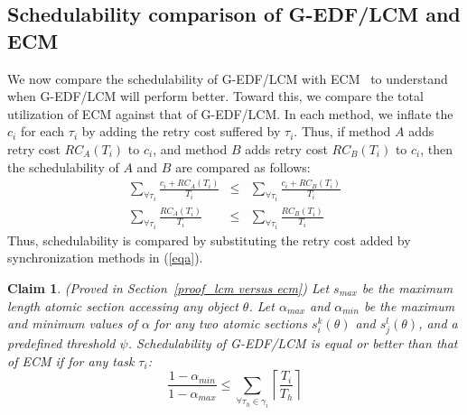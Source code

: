 \documentclass[conference]{sig-alternate}
\newtheorem{clm}{Claim}
\begin{document}
\subsection{Schedulability comparison of G-EDF/LCM and ECM}
\label{performance g-edf-lcm}
We now compare the schedulability of G-EDF/LCM with ECM~\cite{stmconcurrencycontrol:emsoft11} %
to understand when G-EDF/LCM will perform better. 
Toward this, we compare the total utilization of ECM against that of G-EDF/LCM. In each method, we inflate the $c_i$ for each $\tau_i$ by adding the retry cost suffered by $\tau_i$. Thus, if method $A$ adds retry cost $RC_A(T_i)$ to $c_i$, and method $B$ adds retry cost $RC_B(T_i)$ to $c_i$, then the schedulability of $A$ and $B$ are compared as follows:
\begin{eqnarray}
\sum_{\forall \tau_{i}}\frac{c_{i}+RC_A(T_{i})}{T_{i}} & \le & \sum_{\forall \tau_{i}}\frac{c_{i}+RC_B(T_{i})}{T_{i}}\nonumber\\
\sum_{\forall \tau_{i}}\frac{RC_A(T_{i})}{T_{i}} & \le & \sum_{\forall \tau_{i}}\frac{RC_B(T_{i})}{T_{i}}
\label{eqa}\end{eqnarray}
Thus, schedulability is compared by substituting the retry cost added by synchronization methods in (\ref{eqa}).

\begin{clm}\label{lcm versus ecm}
(Proved in Section~\ref{proof_lcm versus ecm}) Let $s_{max}$ be the maximum length atomic section accessing any object $\theta$. Let $\alpha_{max}$ and $\alpha_{min}$ be the maximum and minimum values of $\alpha$ for any two atomic sections $s_i^k(\theta)$ and $s_j^l(\theta)$, and a predefined threshold $\psi$.  Schedulability of G-EDF/LCM is equal or better than that of  ECM if for any task $\tau_i$:
\begin{equation}
\frac{1-\alpha_{min}}{1-\alpha_{max}} \le \sum_{\forall \tau_h \in \gamma_i}\left\lceil\frac{T_i}{T_h}\right\rceil
\label{edf-lcm-ecm}\end{equation}
\end{clm}
\end{document}
